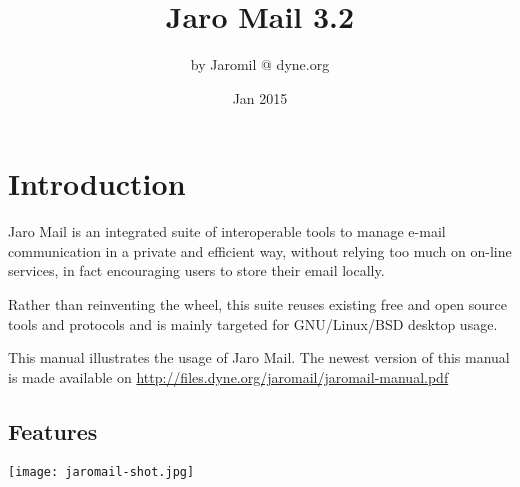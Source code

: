 \documentclass[a4,onecolumn,portrait]{article}
\author{by Jaromil @ dyne.org}
\date{Jan 2015}
\title{Jaro Mail 3.2}
\begin{document}
\maketitle
\tableofcontents

\fancyhf{}
\fancyfoot[C]{-- \thepage\ --}

\renewcommand{\headrulewidth}{0.4pt}
\renewcommand{\footrulewidth}{0.4pt}


\pagebreak


\section{Introduction}
\label{sec-1}

Jaro Mail is an integrated suite of interoperable tools to manage
e-mail communication in a private and efficient way, without relying
too much on on-line services, in fact encouraging users to store their
email locally.

Rather than reinventing the wheel, this suite reuses existing free and
open source tools and protocols and is mainly targeted for
GNU/Linux/BSD desktop usage.

This manual illustrates the usage of Jaro Mail. The newest version of
this manual is made available on \url{http://files.dyne.org/jaromail/jaromail-manual.pdf}

\subsection{Features}
\label{sec-1-1}

\texttt{[image: jaromail-shot.jpg]}
\end{document}
